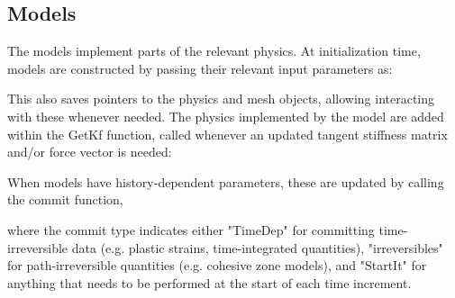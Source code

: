\documentclass[3p]{elsarticle} %
\begin{document}
\subsection{Models}
The models implement parts of the relevant physics. At initialization time, models are constructed by passing their relevant input parameters as:

This also saves pointers to the physics and mesh objects, allowing interacting with these whenever needed. The physics implemented by the model are added within the GetKf function, called whenever an updated tangent stiffness matrix and/or force vector is needed:

When models have history-dependent parameters, these are updated by calling the commit function, 

where the commit type indicates either "TimeDep" for committing time-irreversible data (e.g. plastic strains, time-integrated quantities), "irreversibles" for path-irreversible quantities (e.g. cohesive zone models), and "StartIt" for anything that needs to be performed at the start of each time increment.  
\end{document}
